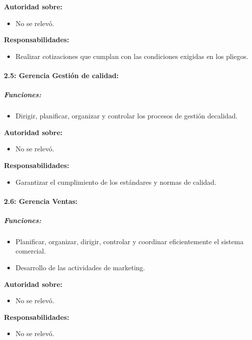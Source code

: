 \documentclass[a4paper,10pt]{article}
\begin{document}
		\textbf{Autoridad sobre:} 
		\begin{itemize}
			\item No se relevó.
		\end{itemize}

		\textbf{Responsabilidades:}
		\begin{itemize}
			\item Realizar cotizaciones que cumplan con las condiciones exigidas en los pliegos.
		\end{itemize}

			\paragraph{2.5: Gerencia Gestión de calidad:}
			\subparagraph{Funciones:}
			\begin{itemize}
	 			\item Dirigir, planificar, organizar y controlar los procesos de gestión decalidad.
	 		\end{itemize}
			

		\textbf{Autoridad sobre:} 
		\begin{itemize}
			\item No se relevó.
		\end{itemize}

		\textbf{Responsabilidades:}
		\begin{itemize}
			\item Garantizar el cumplimiento de los estándares y normas de calidad.
		\end{itemize}


			\paragraph{2.6: Gerencia Ventas:}
			\subparagraph{Funciones:}
			\begin{itemize}
	 			\item Planificar, organizar, dirigir, controlar y coordinar eficientemente el sistema comercial.
	 			\item Desarrollo de las actividades de marketing.
	 		\end{itemize}
			

		\textbf{Autoridad sobre:} 
		\begin{itemize}
			\item No se relevó.
		\end{itemize}

		\textbf{Responsabilidades:}
		\begin{itemize}
			\item No se relevó.
		\end{itemize}
\end{document}
